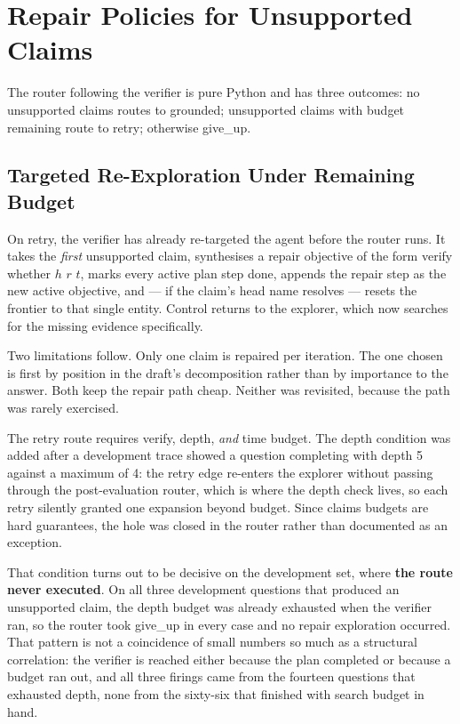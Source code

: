 \section{Repair Policies for Unsupported Claims}\label{sec:repair}

The router following the verifier is pure Python and has three outcomes: no
unsupported claims routes to \textsf{grounded}; unsupported claims with budget
remaining route to \textsf{retry}; otherwise \textsf{give\_up}.

\subsection{Targeted Re-Exploration Under Remaining Budget}

On \textsf{retry}, the verifier has already re-targeted
the agent before the router runs. It takes the
\emph{first} unsupported claim, synthesises a repair objective of the form \textsf{verify whether $h$ $r$ $t$}, marks every active
plan step done, appends the repair step as the new active objective, and --- if
the claim's head name resolves --- resets the frontier to that single entity.
Control returns to the explorer, which now searches for the missing evidence
specifically.

Two limitations follow. Only one claim is repaired per iteration. The one
chosen is first by position in the draft's decomposition rather than by
importance to the answer. Both keep the repair path cheap. Neither was
revisited, because the path was rarely exercised.

The retry route requires verify, depth, \emph{and} time budget. The depth
condition was added after a development trace showed a question completing with
depth 5 against a maximum of 4: the retry edge re-enters the explorer without
passing through the post-evaluation router, which is where the depth check
lives, so each retry silently granted one expansion beyond budget. Since
 claims budgets are hard guarantees, the hole was closed in
the router rather than documented as an exception.

That condition turns out to be decisive on the development set, where
\textbf{the route never executed}. On all three development questions that
produced an unsupported claim, the depth budget was already exhausted when the
verifier ran, so the router took \textsf{give\_up} in every case and no repair
exploration occurred. That pattern is not a coincidence of small numbers so
much as a structural correlation: the verifier is reached either because the
plan completed or because a budget ran out, and all three firings came from
the fourteen questions that exhausted depth, none from the sixty-six that
finished with search budget in hand.

